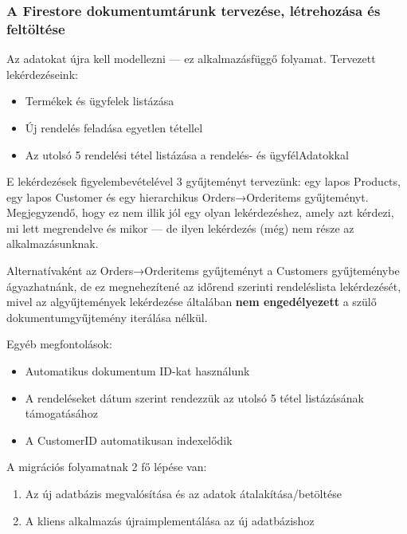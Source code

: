 \documentclass[
  magyar,
]{article}
\providecommand{\tightlist}{%
  \setlength{\itemsep}{0pt}\setlength{\parskip}{0pt}}
\begin{document}
\subsubsection{A Firestore dokumentumtárunk tervezése, létrehozása és
feltöltése}\label{a-firestore-dokumentumtuxe1runk-tervezuxe9se-luxe9trehozuxe1sa-uxe9s-feltuxf6ltuxe9se}

Az adatokat újra kell modellezni --- ez alkalmazásfüggő folyamat.
Tervezett lekérdezéseink:

\begin{itemize}
\tightlist
\item
  Termékek és ügyfelek listázása
\item
  Új rendelés feladása egyetlen tétellel
\item
  Az utolsó 5 rendelési tétel listázása a rendelés- és ügyfélAdatokkal
\end{itemize}

E lekérdezések figyelembevételével 3 gyűjteményt tervezünk: egy lapos
Products, egy lapos Customer és egy hierarchikus Orders→Orderitems
gyűjteményt. Megjegyzendő, hogy ez nem illik jól egy olyan
lekérdezéshez, amely azt kérdezi, mi lett megrendelve és mikor --- de
ilyen lekérdezés (még) nem része az alkalmazásunknak.

Alternatívaként az Orders→Orderitems gyűjteményt a Customers
gyűjteménybe ágyazhatnánk, de ez megnehezítené az időrend szerinti
rendeléslista lekérdezését, mivel az algyűjtemények lekérdezése
általában \textbf{nem engedélyezett} a szülő dokumentumgyűjtemény
iterálása nélkül.

Egyéb megfontolások:

\begin{itemize}
\tightlist
\item
  Automatikus dokumentum ID-kat használunk
\item
  A rendeléseket dátum szerint rendezzük az utolsó 5 tétel listázásának
  támogatásához
\item
  A CustomerID automatikusan indexelődik
\end{itemize}

A migrációs folyamatnak 2 fő lépése van:

\begin{enumerate}
\def\labelenumi{\arabic{enumi}.}
\tightlist
\item
  Az új adatbázis megvalósítása és az adatok átalakítása/betöltése
\item
  A kliens alkalmazás újraimplementálása az új adatbázishoz
\end{enumerate}
\end{document}

